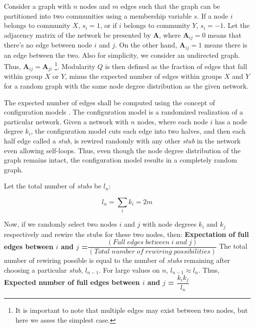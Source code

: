 {Consider a graph with $n$ nodes and $m$ edges such that the graph can be partitioned into two communities using a membership variable $s$. If a node $i$ belongs to community $X$, $s_i = 1$, or if $i$ belongs to community $Y$, $s_i = -1$. Let the adjacency matrix of the network be presented by $\textbf{A}$, where $\textbf{A}_{ij} = 0$ means that there's no edge between node $i$ and $j$. On the other hand, $\textbf{A}_{ij} = 1$ means there is an edge between the two. Also for simplicity, we consider an undirected graph. Thus, $\textbf{A}_{ij} = \textbf{A}_{ji}$ \footnote{It is important to note that multiple edges may exist between two nodes, but here we asses the simplest case.}. Modularity $Q$ is then defined as the fraction of  edges that fall within group $X$ or $Y$, minus the expected number of edges within groups $X$ and $Y$ for a random graph with the same node degree distribution as the given network.

The expected number of edges shall be computed using the concept of configuration models \cite{ref-16}. The configuration model is a randomized realization of a particular network. Given a network with $n$ nodes, where each node $i$ has a node degree $k_i$, the configuration model cuts each edge into two halves, and then each half edge called a \textit{stub}, is rewired randomly with any other \textit{stub} in the network even allowing self-loops. Thus, even though the node degree distribution of the graph remains intact, the configuration model results in a completely random graph.

Let the total number of \textit{stubs} be $l_n$:

\begin{equation}
l_n = \sum\limits_i k_i = 2m
\end{equation}

Now, if we randomly select two nodes $i$ and $j$ with node degrees $k_i$ and $k_j$ respectively and rewire the stubs for these two nodes, then:
\newline\newline
\textbf{Expectation of full edges between $i$ and $j$ =$\dfrac{(Full \; edges \; between \; i \; and \; j )}{(Total \; number \; of \; rewiring \; possibilities)}$} 
\newline\newline
The total number of rewiring possible is equal to the number of \textit{stubs} remaining after choosing a particular \textit{stub}, $l_{n-1}$. For large values on $n$, $l_{n-1} \approx l_n$. Thus,
\newline\newline
\textbf{Expected number of full edges between $i$ and $j$ = $\dfrac{k_i k_j}{l_n}$}
\newline\newline

}
